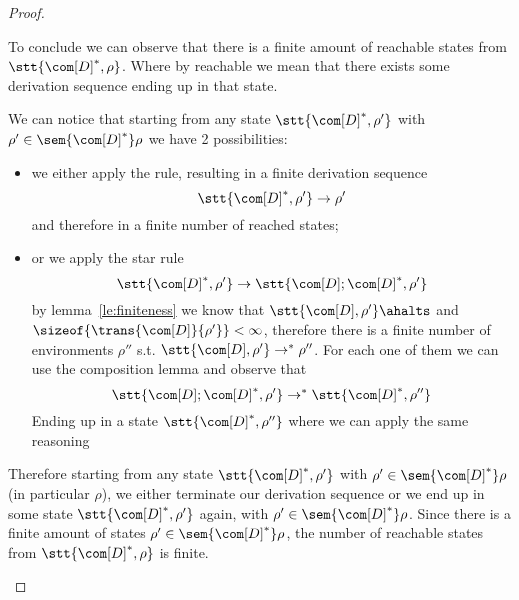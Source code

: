 \begin{proof}
\begin{itemize}
    To conclude we can observe that there is a finite amount of
    reachable states from \(\stt{\com[D]^*, \rho}\). Where by reachable
    we mean that there exists some derivation sequence ending up in
    that state.

    We can notice that starting from any state
    \(\stt{\com[D]^*, \rho'}\) with \(\rho'\in \sem{\com[D]^*}\rho\)
    we have 2 possibilities:
    \begin{itemize}
    \item we either apply the \starfix rule, resulting in a finite
      derivation sequence
      \begin{equation*}
        \stt{\com[D]^*, \rho'} \to \rho'
      \end{equation*}
      and therefore in a finite number of reached states;
    \item or we apply the star rule
      \begin{equation*}
        \stt{\com[D]^*, \rho'} \to \stt{\com[D];\com[D]^*, \rho'}
      \end{equation*}
      by lemma~\ref{le:finiteness} we know that
      \(\stt{\com[D], \rho'}\ahalts\) and
      \(\sizeof{\trans{\com[D]}{\rho'}} < \infty\), therefore there is
      a finite number of environments \(\rho''\)
      s.t. \(\stt{\com[D],\rho'} \to^* \rho''\). For each one of them
      we can use the composition lemma and observe that
      \begin{equation*}
        \stt{\com[D];\com[D]^*, \rho'} \to^* \stt{\com[D]^*, \rho''}
      \end{equation*}
      Ending up in a state \(\stt{\com[D]^*, \rho''}\) where we can
      apply the same reasoning
    \end{itemize}
    Therefore starting from any state \(\stt{\com[D]^*, \rho'}\) with
    \(\rho'\in \sem{\com[D]^*}\rho\) (in particular \(\rho\)), we
    either terminate our derivation sequence or we end up in some
    state \(\stt{\com[D]^*, \rho'}\) again, with
    \(\rho'\in\sem{\com[D]^*}\rho\). Since there is a finite amount of
    states \(\rho'\in\sem{\com[D]^*}\rho\), the number of reachable
    states from \(\stt{\com[D]^*, \rho}\) is finite.
  \end{itemize}
\end{proof}
